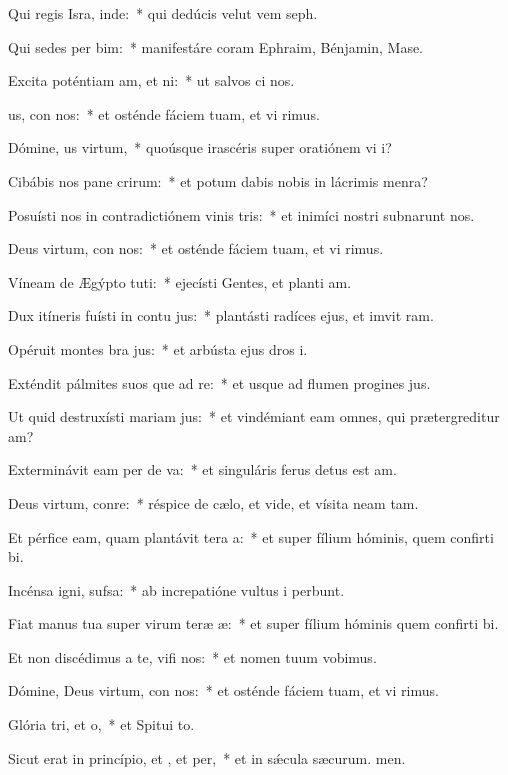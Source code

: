 \item Qui regis Isra, inde:~* qui dedúcis velut vem seph.
\item Qui sedes per bim:~* manifestáre coram Ephraim, Bénjamin,  Mase.
\item Excita poténtiam am, et ni:~* ut salvos ci nos.
\item {}us, con nos:~* et osténde fáciem tuam, et vi rimus.
\item Dómine, us virtum,~* quoúsque irascéris super oratiónem vi i?
\item Cibábis nos pane crirum:~* et potum dabis nobis in lácrimis  menra?
\item Posuísti nos in contradictiónem vinis tris:~* et inimíci nostri subnarunt nos.
\item Deus virtum, con nos:~* et osténde fáciem tuam, et vi rimus.
\item Víneam de Ægýpto tuti:~* ejecísti Gentes, et planti am.
\item Dux itíneris fuísti in contu jus:~* plantásti radíces ejus, et imvit ram.
\item Opéruit montes bra jus:~* et arbústa ejus dros i.
\item Exténdit pálmites suos que ad re:~* et usque ad flumen progines jus.
\item Ut quid destruxísti mariam jus:~* et vindémiant eam omnes, qui prætergreditur am?
\item Exterminávit eam per de va:~* et singuláris ferus detus est am.
\item Deus virtum, conre:~* réspice de cælo, et vide, et vísita neam tam.
\item Et pérfice eam, quam plantávit tera a:~* et super fílium hóminis, quem confirti bi.
\item Incénsa igni,  sufsa:~* ab increpatióne vultus i perbunt.
\item Fiat manus tua super virum teræ æ:~* et super fílium hóminis quem confirti bi.
\item Et non discédimus a te, vifi nos:~* et nomen tuum vobimus.
\item Dómine, Deus virtum, con nos:~* et osténde fáciem tuam, et vi rimus.
\item Glória tri, et o,~* et Spitui to.
\item Sicut erat in princípio, et , et per,~* et in sǽcula sæcurum. men.
